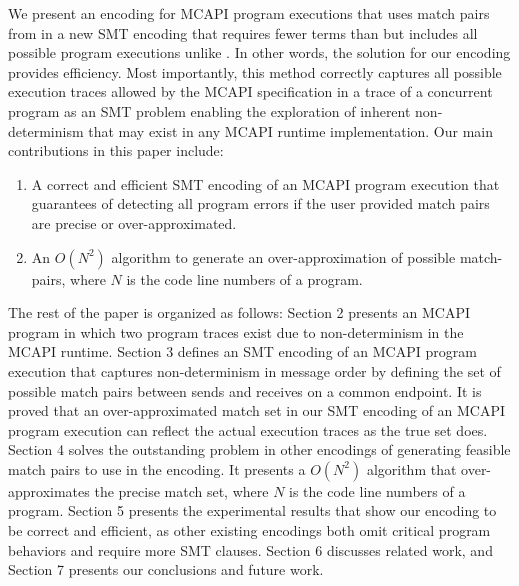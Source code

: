 We present an encoding for MCAPI program executions that uses match pairs from \cite{sharma:fmcad09} in a new SMT encoding that requires fewer terms than \cite{elwakil:padtad10} but includes all possible program executions unlike \cite{elwakil:padtad10}. In other words, the solution for our encoding provides efficiency. Most importantly, this method correctly captures all possible execution traces allowed by the MCAPI specification in a trace of a concurrent program as an SMT problem enabling the exploration of inherent non-determinism that may exist in any MCAPI runtime implementation.
Our main contributions in this paper include:

\begin{enumerate}
\item  A correct and efficient SMT encoding of an MCAPI program execution that guarantees of detecting all program errors if the user provided match pairs are precise or over-approximated.
\item  An $O(N^2)$ algorithm to generate an over-approximation of possible match-pairs, where $N$ is the code line numbers of a program.
\end{enumerate}

The rest of the paper is organized as follows:
Section 2 presents an MCAPI program in which two program traces exist due to non-determinism in the MCAPI runtime. Section 3 defines an SMT encoding of an MCAPI program execution that captures non-determinism in message order by defining the set of possible match pairs between sends and receives on a common endpoint. It is proved that an over-approximated match set in our SMT encoding of an MCAPI program execution can reflect the actual execution traces as the true set does. Section 4 solves the outstanding problem in other encodings of generating feasible match pairs to use in the encoding. It presents a $O(N^2)$ algorithm that over-approximates the precise match set, where $N$ is the code line numbers of a program. Section 5 presents the experimental results that show our encoding to be correct and efficient, as other existing encodings both omit critical program behaviors and require more SMT clauses. Section 6 discusses related
work, and Section 7 presents our conclusions and future work.


